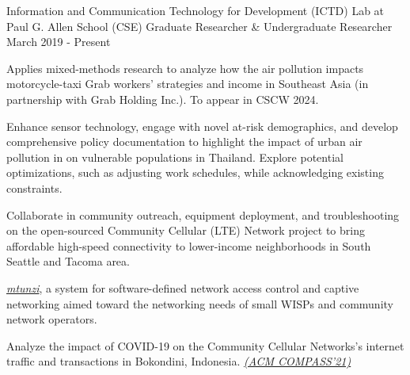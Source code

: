 

\begin{cventries}


  \cventry
    {Information and Communication Technology for Development (ICTD) Lab at Paul G. Allen School (CSE)} %
    {Graduate Researcher \& Undergraduate Researcher} %
    {March 2019 - Present} %
    {} %
    {
      \begin{cvitems} %
        \item {
          Applies mixed-methods research to analyze how the air pollution impacts motorcycle-taxi Grab workers' strategies and income in Southeast Asia (in partnership with Grab Holding Inc.). To appear in CSCW 2024.
        }
        \item {
          Enhance sensor technology, engage with novel at-risk demographics, and develop comprehensive policy documentation to highlight the impact of urban air pollution in on vulnerable populations in Thailand. Explore potential optimizations, such as adjusting work schedules, while acknowledging existing constraints.
        }
        \item {
          Collaborate in community outreach, equipment deployment, and troubleshooting on the open-sourced Community Cellular (LTE) Network project to bring affordable high-speed connectivity to lower-income neighborhoods in South Seattle and Tacoma area.
        }  
        \item{
            \href{https://github.com/innoobijr/cse-550-finalproject-mtunzi}{\textit{mtunzi}}, a system for software-defined network access control and captive networking aimed toward the networking needs of small WISPs and community network operators.
        }
        \item {
          Analyze the impact of COVID-19 on the Community Cellular Networks's internet traffic and transactions in Bokondini, Indonesia. \href{https://dl.acm.org/doi/10.1145/3460112.3472311}{\textit{(ACM COMPASS'21)}}
        }
      \end{cvitems}
    }


\end{cventries}
